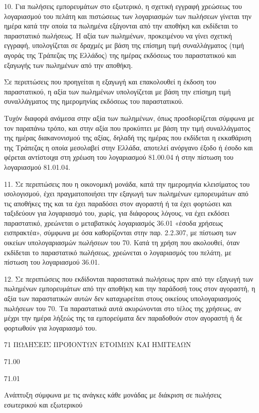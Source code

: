 \documentclass[A4,10pt,greek]{book}
\begin{document}
10. Για πωλήσεις εμπορευμάτων στο εξωτερικό, η σχετική εγγραφή χρεώσεως του λογαριασμού του πελάτη και πιστώσεως των λογαριασμών των πωλήσεων γίνεται την ημέρα κατά την οποία τα πωλημένα εξάγονται από την αποθήκη και εκδίδεται το παραστατικό πωλήσεως. Η αξία των πωλημένων, προκειμένου να γίνει σχετική εγγραφή, υπολογίζεται σε δραχμές με βάση της επίσημη τιμή συναλλάγματος (τιμή αγοράς της Τράπεζας της Ελλάδος) της ημέρας εκδόσεως του παραστατικού και εξαγωγής των πωλημένων από την αποθήκη.

Σε περιπτώσεις που προηγείται η εξαγωγή και επακολουθεί η έκδοση του παραστατικού, η αξία των πωλημένων υπολογίζεται με βάση την επίσημη τιμή συναλλάγματος της ημερομηνίας εκδόσεως του παραστατικού.

Τυχόν διαφορά ανάμεσα στην αξία των πωλημένων, όπως προσδιορίζεται σύμφωνα με τον παραπάνω τρόπο, και στην αξία που προκύπτει με βάση την τιμή συναλλάγματος της ημέρας διακανονισμού της αξίας, δηλαδή της ημέρας που εκδίδεται η εκκαθάριση της Τράπεζας η οποία μεσολαβεί στην Ελλάδα, αποτελεί ανόργανο έξοδο ή έσοδο και φέρεται αντίστοιχα στη χρέωση του λογαριασμού 81.00.04 ή στην πίστωση του λογαριασμού 81.01.04.

11. Σε περιπτώσεις που η οικονομική μονάδα, κατά την ημερομηνία κλεισίματος του ισολογισμού, έχει πραγματοποιήσει την εξαγωγή των πωλημένων εμπορευμάτων από τις αποθήκες της και τα έχει παραδόσει στον αγοραστή ή τα έχει φορτώσει και ταξιδεύουν για λογαριασμό του, χωρίς, για διάφορους λόγους, να έχει εκδόσει παραστατικό, χρεώνεται ο μεταβατικός λογαριασμός 36.01 «έσοδα χρήσεως εισπρακτέα», σύμφωνα με όσα καθορίζονται στην παρ. 2.2.307, με πίστωση των οικείων υπολογαριασμών πωλήσεων του 70. Κατά τη χρήση που ακολουθεί, όταν εκδίδεται το παραστατικό πωλήσεως, χρεώνεται ο λογαριασμός του πελάτη, με πίστωση του λογαριασμού 36.01.

12. Σε περιπτώσεις που εκδίδονται παραστατικά πωλήσεως πριν από την εξαγωγή των πωλημένων εμπορευμάτων από την αποθήκη και την παράδοσή τους στον αγοραστή, η αξία των παραστατικών αυτών δεν καταχωρείται στους οικείους υπολογαριασμούς πωλήσεων του 70. Τα παραστατικά αυτά ακυρώνονται στο τέλος της χρήσεως, αν μέχρι την ημέρα λήξεώς της τα εμπορεύματα δεν παραδοθούν στον αγοραστή ή δε φορτωθούν για λογαριασμό του.

71    ΠΩΛΗΣΕΙΣ ΠΡΟΪΟΝΤΩΝ ΕΤΟΙΜΩΝ ΚΑΙ ΗΜΙΤΕΛΩΝ

        71.00

        71.01

                     Ανάπτυξη σύμφωνα με τις ανάγκες κάθε μονάδας με διάκριση
                     σε πωλήσεις εσωτερικού και εξωτερικού
\end{document}
